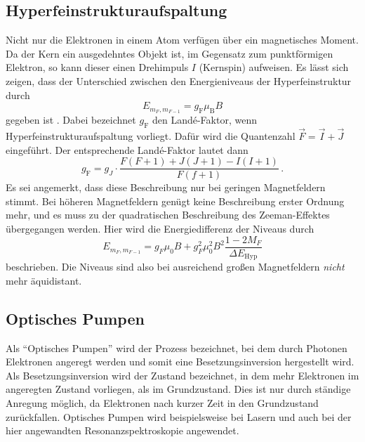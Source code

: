 \subsection{Hyperfeinstrukturaufspaltung}

Nicht nur die Elektronen in einem Atom verfügen über ein magnetisches Moment.
Da der Kern ein ausgedehntes Objekt ist, im Gegensatz zum punktförmigen Elektron, so kann dieser einen Drehimpuls $I$ (Kernspin) aufweisen.
Es lässt sich zeigen, dass der Unterschied zwischen den Energieniveaus der Hyperfeinstruktur durch
\begin{equation} \label{eq:landefaktor}
    E_{m_F,m_{F-1}} = g_\text{F} \mu_\text{B} B
\end{equation}
gegeben ist \cite{demtroeder3}.
Dabei bezeichnet $g_\text{F}$ den Landé-Faktor, wenn Hyperfeinstrukturaufspaltung vorliegt.
Dafür wird die Quantenzahl $\vec{F} = \vec{I} + \vec{J}$ eingeführt.
Der entsprechende Landé-Faktor \cite{optical_pumping} lautet dann
\begin{equation*}
    g_\text{F} = g_J \cdot \frac{F(F+1)+J(J+1)-I(I+1)}{F(f+1)} \, .
\end{equation*}
Es sei angemerkt, dass diese Beschreibung nur bei geringen Magnetfeldern stimmt.
Bei höheren Magnetfeldern genügt keine Beschreibung erster Ordnung mehr, und es muss zu der quadratischen Beschreibung des Zeeman-Effektes übergegangen werden.
Hier wird die Energiedifferenz der Niveaus durch
\begin{equation*}
    E_{m_F,m_{F-1}} = g_F \mu_0 B+g_F^2 \mu_0^2 B^2 \frac{1-2 M_F}{\Delta E_{\mathrm{Hyp}}}
\end{equation*}
beschrieben. Die Niveaus sind also bei ausreichend großen Magnetfeldern \textit{nicht} mehr äquidistant.

\subsection{Optisches Pumpen}

Als \enquote{Optisches Pumpen} wird der Prozess bezeichnet, bei dem durch Photonen Elektronen angeregt werden und somit
eine Besetzungsinversion hergestellt wird.
Als Besetzungsinversion wird der Zustand bezeichnet, in dem mehr Elektronen im angeregten Zustand vorliegen, als im Grundzustand.
Dies ist nur durch ständige Anregung möglich, da Elektronen nach kurzer Zeit in den Grundzustand zurückfallen.
Optisches Pumpen  wird beispielsweise bei Lasern und auch bei der hier angewandten Resonanzspektroskopie angewendet.

